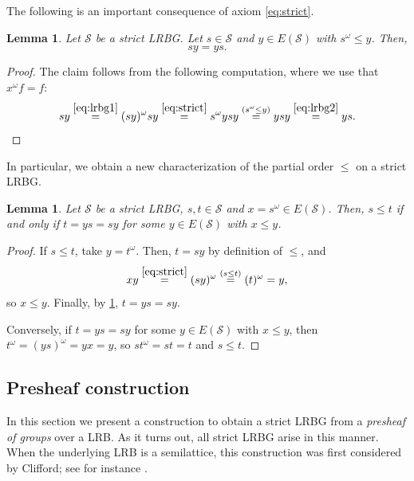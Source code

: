 \documentclass[11pt, oneside, reqno]{amsart}
\newtheorem{lemma}[theorem]{Lemma}
\theoremstyle{definition}
\numberwithin{equation}{section}
\def \SS{{\mathcal{S}}}
\begin{document}
The following is an important consequence of axiom \cref{eq:strict}.

\begin{lemma}\label{lem:xf=fx}
    Let $\SS$ be a strict LRBG.
    Let $s \in \SS$ and $y \in E(\SS)$ with $s^\omega \leq y$. Then,
    \[        sy = ys.      \]
\end{lemma}

\begin{proof}
    The claim follows from the following computation, where we use that $x^\omega f = f$:
    \begin{equation*}
        s y                         \overset{\cref{eq:lrbg1}}{=}
        (s y)^\omega s y            \overset{\cref{eq:strict}}{=}
        s^\omega y s y              \overset{(s^\omega \leq y)}{=}
        y s y                       \overset{\cref{eq:lrbg2}}{=}
        y s.                        \qedhere 
    \end{equation*}
\end{proof}

In particular, we obtain a new characterization of the partial order $\leq$ on a strict LRBG.

\begin{lemma}\label{lem:sLRBG-leq}
    Let $\SS$ be a strict LRBG, $s,t \in \SS$ and $x = s^\omega \in E(\SS)$.
    Then, $s \leq t$ if and only if $t = ys = sy$ for some $y \in E(\SS)$ with $x \leq y$.
\end{lemma}

\begin{proof}
    If $s \leq t$, take $y = t^\omega$. Then, $t = s y$ by definition of $\leq$, and
    \[
        x y                 \overset{\cref{eq:strict}}{=}
        (s y)^\omega        \overset{(s \leq t)}{=}
        (t)^\omega = y,
    \]
    so $x \leq y$. Finally, by \cref{lem:xf=fx}, $t = ys = sy$.

    Conversely, if $t = ys = sy$ for some $y \in E(\SS)$ with $x \leq y$, then $t^\omega = (y s) ^\omega = y x = y$, so $s t^\omega = s t = t$ and $s \leq t$.
\end{proof}

\subsection{Presheaf construction}

In this section we present a construction to obtain a strict LRBG from a {\em presheaf of groups} over a LRB.
As it turns out, all strict LRBG arise in this manner.
When the underlying LRB is a semilattice, this construction was first
considered by Clifford; see for instance \citep[Theorem 4.11]{cp61semigroupsI}.
\end{document}
